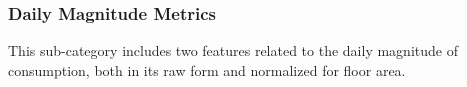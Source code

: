 \subsubsection{Daily Magnitude Metrics}

This sub-category includes two features related to the daily magnitude of consumption, both in its raw form and normalized for floor area.